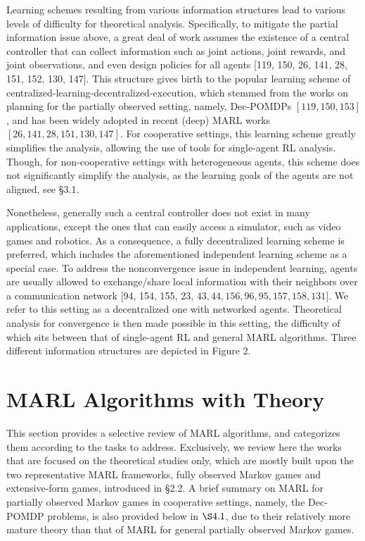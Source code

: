 \documentclass[10pt]{article}
\begin{document}
Learning schemes resulting from various information structures lead to various levels of difficulty for theoretical analysis. Specifically, to mitigate the partial information issue above, a great deal of work assumes the existence of a central controller that can collect information such as joint actions, joint rewards, and joint observations, and even design policies for all agents [119, 150, 26, 141, 28, 151, 152, 130, 147]. This structure gives birth to the popular learning scheme of centralized-learning-decentralized-execution, which stemmed from the works on planning for the partially observed setting, namely, Dec-POMDPs $[119,150,153]$, and has been widely adopted in recent (deep) MARL works $[26,141,28,151,130,147]$. For cooperative settings, this learning scheme greatly simplifies the analysis, allowing the use of tools for single-agent RL analysis. Though, for non-cooperative settings with heterogeneous agents, this scheme does not significantly simplify the analysis, as the learning goals of the agents are not aligned, see §3.1.

Nonetheless, generally such a central controller does not exist in many applications, except the ones that can easily access a simulator, such as video games and robotics. As a consequence, a fully decentralized learning scheme is preferred, which includes the aforementioned independent learning scheme as a special case. To address the nonconvergence issue in independent learning, agents are usually allowed to exchange/share local information with their neighbors over a communication network [94, 154, 155, 23, $43,44,156,96,95,157,158,131]$. We refer to this setting as a decentralized one with networked agents. Theoretical analysis for convergence is then made possible in this setting, the difficulty of which sits between that of single-agent RL and general MARL algorithms. Three different information structures are depicted in Figure 2.

\section{MARL Algorithms with Theory}
This section provides a selective review of MARL algorithms, and categorizes them according to the tasks to address. Exclusively, we review here the works that are focused on the theoretical studies only, which are mostly built upon the two representative MARL frameworks, fully observed Markov games and extensive-form games, introduced in §2.2. A brief summary on MARL for partially observed Markov games in cooperative settings, namely, the Dec-POMDP problems, is also provided below in $\S 4.1$, due to their relatively more mature theory than that of MARL for general partially observed Markov games.
\end{document}
